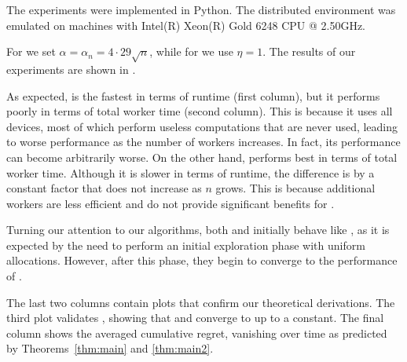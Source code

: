 The experiments were implemented in Python.
The distributed environment was emulated on machines with Intel(R) Xeon(R) Gold 6248 CPU @ 2.50GHz.

For  we set $\alpha = \alpha_n = 4 \cdot 29 \sqrt{n}$, while for  we use $\eta = 1$.
The results of our experiments are shown in .

As expected,  is the fastest in terms of runtime (first column), but it performs poorly in terms of total worker time (second column).
This is because it uses all devices, most of which perform useless computations that are never used, leading to worse performance as the number of workers increases.
In fact, its performance can become arbitrarily worse. On the other hand,  performs best in terms of total worker time.
Although it is slower in terms of runtime, the difference is by a constant factor that does not increase as $n$ grows.
This is because additional workers are less efficient and do not provide significant benefits for .

Turning our attention to our algorithms, both  and  initially behave like , as it is expected by the need to perform an initial exploration phase with uniform allocations.
However, after this phase, they begin to converge to the performance of .


The last two columns contain plots that confirm our theoretical derivations.
The third plot validates , showing that  and  converge to  up to a constant.
The final column shows the averaged cumulative regret, vanishing over time as predicted by Theorems~\ref{thm:main} and \ref{thm:main2}.




